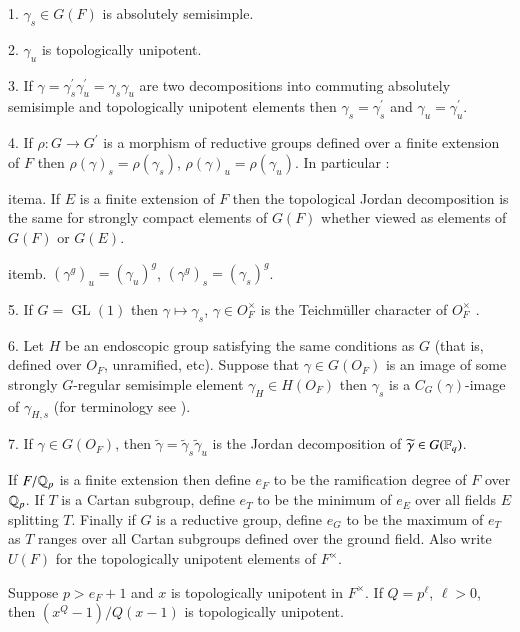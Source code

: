 \documentclass{amsart}
\newenvironment{cthm}[1]
  {\renewcommand\thethm{\bf #1}\thm}
  {\endthm}
\def\Rats{{\Bbb Q}}                          %
\def\GL{\operatorname{GL}}
\def\IWASAWA{14}
\def\LANGLANDSO{21}
\begin{document}
{1.}   $\gamma_s\in G(F)$ is absolutely semisimple.

{2.} $\gamma_u$ is topologically unipotent.

{3.} If $\gamma=\gamma_s^\prime\gamma_u^\prime
=\gamma_s\gamma_u$
are two decompositions into commuting absolutely semisimple and
topologically unipotent elements then $\gamma_s
=\gamma_s^\prime$ and $\gamma_u=\gamma_u^\prime$.

{4.} If $\rho:G\to G^\prime$ is a morphism of reductive groups
defined over a finite extension of $F$ then $\rho(\gamma)_s=\rho(\gamma_s)$,
$\rho(\gamma)_u =\rho(\gamma_u)$. In particular :

item{a.} 
If $E$ is a finite  extension of $F$
then the topological Jordan decomposition is the same
for strongly compact elements of $G(F)$ whether viewed as elements of
$G(F)$ or $G({E})$.

item{b.}
$(\gamma^g)_u = (\gamma_u)^g$, $(\gamma^g)_s = (\gamma_s)^g$.

{5.} If $G=\GL(1)$
then $\gamma\mapsto\gamma_s$,
$\gamma\in O_F^\times$ is the Teichm\"uller 
character of $O_F^\times$ \cite{\IWASAWA}.

{6.}  Let $H$ be an endoscopic group satisfying
the same conditions as $G$ (that is, defined over $O_F$, unramified,
etc). Suppose that $\gamma\in G(O_F)$ is an image of
some strongly $G$-regular semisimple element 
$\gamma_H\in H(O_F)$ then
$\gamma_s$ is a $C_G(\gamma)$-image of 
$\gamma_{H,s}$ (for terminology see \cite{\LANGLANDSO}).

{7.} If $\gamma\in G(O_F)$, then $\widetilde \gamma=\widetilde\gamma_s\widetilde\gamma_u$
is the Jordan decomposition of $\widetilde\gamma\in G({\Bbb F_q})$.
\par
\smallskip

If $F/\Rats_p$ is a finite extension then define $e_F$ to be the ramification
degree of $F$ over $\Rats_p$.  If $T$ is a Cartan subgroup, define $e_T$ to be
the minimum of $e_E$ over all fields $E$ splitting $T$.  Finally if $G$ is a
reductive group, define $e_G$ to be the maximum of $e_T$ as $T$ ranges over all
Cartan subgroups defined over the ground field.  Also write $U(F)$ for the topologically
unipotent elements of $F^\times$.

\begin{cthm}{Lemma 3.1}  Suppose $p> e_F+1$ and $x$ is topologically
unipotent in $F^\times$.
If $Q=p^\ell$, $\ell>0$, then $(x^Q-1)/Q(x-1)$ is topologically unipotent.
\end{cthm}
\end{document}
